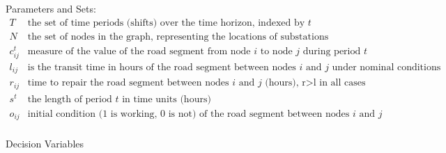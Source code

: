 \documentclass{article}
\begin{document}
	Parameters and Sets:
	\begin{displaymath}
	\begin{array}{ll}
	T & \mbox{the set of time periods (shifts) over the time horizon, indexed by $t$}\\
	N & \mbox{the set of nodes in the graph, representing the locations of substations}\\
	c_{ij}^t & \mbox{measure of the value of the road segment from node $i$ to node $j$ during period $t$}\\
	l_{ij} & \mbox{is the transit time in hours of the road segment between nodes $i$ and $j$ under nominal conditions}\\
	r_{ij} & \mbox{time to repair the road segment between nodes $i$ and $j$ (hours), r>l in all cases}\\
	s^t & \mbox{the length of period $t$ in time units (hours)}\\
	o_{ij} & \mbox{initial condition (1 is working, 0 is not) of the road segment between nodes $i$ and $j$}\\
	\end{array}
	\end{displaymath}
	
	Decision Variables
	
\end{document}
